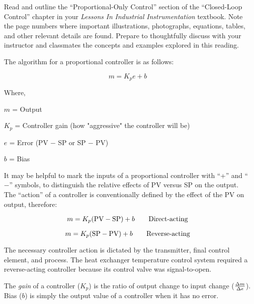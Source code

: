 

Read and outline the ``Proportional-Only Control'' section of the ``Closed-Loop Control'' chapter in your {\it Lessons In Industrial Instrumentation} textbook.  Note the page numbers where important illustrations, photographs, equations, tables, and other relevant details are found.  Prepare to thoughtfully discuss with your instructor and classmates the concepts and examples explored in this reading.














The algorithm for a proportional controller is as follows:

$$m = K_p e + b$$

\noindent
Where,

$m$ = Output

$K_p$ = Controller gain (how "aggressive" the controller will be)

$e$ = Error (PV $-$ SP or SP $-$ PV)

$b$ = Bias

\vskip 10pt

It may be helpful to mark the inputs of a proportional controller with ``+'' and ``$-$'' symbols, to distinguish the relative effects of PV versus SP on the output.  The ``action'' of a controller is conventionally defined by the effect of the PV on output, therefore:

$$m = K_p(\hbox{PV} - \hbox{SP}) + b \hskip 20pt \hbox{Direct-acting}$$

$$m = K_p(\hbox{SP} - \hbox{PV}) + b \hskip 20pt \hbox{Reverse-acting}$$

The necessary controller action is dictated by the transmitter, final control element, and process.  The heat exchanger temperature control system required a reverse-acting controller because its control valve was signal-to-open.

\vskip 10pt

The {\it gain} of a controller ($K_p$) is the ratio of output change to input change ($\Delta m \over \Delta e$).  Bias ($b$) is simply the output value of a controller when it has no error.  

